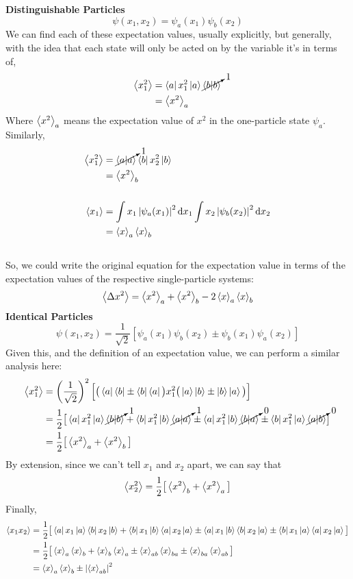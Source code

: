 \documentclass[a4paper]{article}
\begin{document}
\textbf{Distinguishable Particles}
	\[ \psi(x_1,x_2) = \psi_a(x_1)\psi_b(x_2) \]
	We can find each of these expectation values, usually explicitly, but
	generally, with the idea that each state will only be acted on by
	the variable it's in terms of,
	\begin{align*}
		\exval{x_1^2} &= 
		\brak{a}x_1^2\bket{a}\cancelto{1}{\braket{b}{b}}\\
		&= \exval{x^2}_a
	\end{align*}
	Where $\exval{x^2}_a$ means the expectation value of $x^2$ in the
	one-particle state $\psi_a$.
	Similarly,
	\begin{align*}
	\exval{x_1^2} &= \cancelto{1}{\braket{a}{a}}
	\brak{b}x_2^2\bket{b}\\
		&= \exval{x^2}_b\\~\\
	\exval{x_1} &= \int x_1\abs{\psi_a(x_1)}^2\d x_1
		\int x_2\abs{\psi_b(x_2)}^2\d x_2\\
		&= \exval{x}_a\exval{x}_b\\~\\
	\end{align*}
	So, we could write the original equation for the expectation value in
	terms of the expectation values of the respective single-particle
	systems:
	\[ \exval{\Delta x^2} = 
		\exval{x^2}_a+\exval{x^2}_b-2\exval{x}_a\exval{x}_b \]
\textbf{Identical Particles}
	\[ \psi(x_1,x_2) = \frac{1}{\sqrt{2}}[\psi_a(x_1)\psi_b(x_2)
	\pm\psi_b(x_1)\psi_a(x_2)] \] 
	Given this, and the definition of an expectation value, we can perform
	a similar analysis here:
	\begin{align*}
		\exval{x_1^2} &= \left(\frac{1}{\sqrt{2}}\right)^2\Big[
		\big(\brak{a}\brak{b}\pm\brak{b}\brak{a}\big)x_1^2
		\big(\bket{a}\bket{b}\pm\bket{b}\bket{a}\big)\Big]\\
		&= \frac{1}{2}\big[
			\brak{a}x_1^2\bket{a}\cancelto{1}{\braket{b}{b}} + 
			\brak{b}x_1^2\bket{b}\cancelto{1}{\braket{a}{a}} \pm
			\brak{a}x_1^2\bket{b}\cancelto{0}{\braket{b}{a}} \pm
			\brak{b}x_1^2\bket{a}\cancelto{0}{\braket{a}{b}}
		\big]\\
		&= \frac{1}{2}\big[\exval{x^2}_a+\exval{x^2}_b\big]
	\end{align*}
	By extension, since we can't tell $x_1$ and $x_2$ apart, we can say
	that
	\[ \exval{x_2^2} = \frac{1}{2}\big[\exval{x^2}_b+\exval{x^2}_a\big] \]
	Finally,
	\begin{align*}
		\exval{x_1x_2} &= \frac{1}{2}\big[
			\brak{a}x_1\bket{a}\brak{b}x_2\bket{b} +
			\brak{b}x_1\bket{b}\brak{a}x_2\bket{a} \pm
			\brak{a}x_1\bket{b}\brak{b}x_2\bket{a} \pm
			\brak{b}x_1\bket{a}\brak{a}x_2\bket{a}
		\big]\\
		&=	\frac{1}{2}\big[
			\exval{x}_a\exval{x}_b +
			\exval{x}_b\exval{x}_a \pm
			\exval{x}_{ab}\exval{x}_{ba} \pm
			\exval{x}_{ba}\exval{x}_{ab}
		\big]\\
		&=	\exval{x}_{a}\exval{x}_{b} \pm \abs{\exval{x}_{ab}}^2
	\end{align*}
\end{document}
